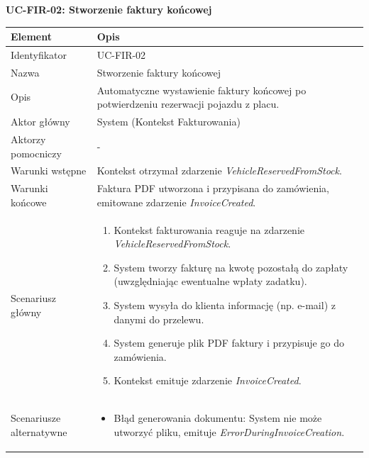 \textbf{UC-FIR-02: Stworzenie faktury końcowej}

\begin{longtable}{|p{4cm}|p{11cm}|}
\hline
\textbf{Element} & \textbf{Opis} \\
\hline

Identyfikator & UC-FIR-02 \\
\hline

Nazwa & Stworzenie faktury końcowej \\
\hline

Opis & 
Automatyczne wystawienie faktury końcowej po potwierdzeniu rezerwacji pojazdu z placu. \\
\hline

Aktor główny & System (Kontekst Fakturowania) \\
\hline

Aktorzy pomocniczy & - \\
\hline

Warunki wstępne & 
Kontekst otrzymał zdarzenie \textit{VehicleReservedFromStock}. \\
\hline

Warunki końcowe & 
Faktura PDF utworzona i przypisana do zamówienia, emitowane zdarzenie \textit{InvoiceCreated}. \\
\hline

Scenariusz główny & 
\begin{enumerate}
    \item Kontekst fakturowania reaguje na zdarzenie \textit{VehicleReservedFromStock}.
    \item System tworzy fakturę na kwotę pozostałą do zapłaty (uwzględniając ewentualne wpłaty zadatku).
    \item System wysyła do klienta informację (np. e-mail) z danymi do przelewu.
    \item System generuje plik PDF faktury i przypisuje go do zamówienia.
    \item Kontekst emituje zdarzenie \textit{InvoiceCreated}.
\end{enumerate} \\
\hline

Scenariusze alternatywne & 
\begin{itemize}
    \item [A1] Błąd generowania dokumentu: System nie może utworzyć pliku, emituje \textit{ErrorDuringInvoiceCreation}.
\end{itemize} \\
\hline
\end{longtable}

